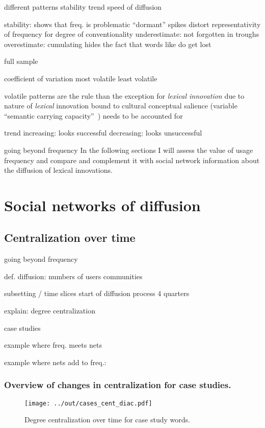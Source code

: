 \documentclass[draft, a4paper, abstract=on]{scrartcl}
\begin{document}
different patterns
stability
trend
speed of diffusion

stability: shows that freq. is problematic
\enquote{dormant}
spikes distort representativity of frequency for degree of conventionality
underestimate:  not forgotten in troughs
overestimate: cumulating hides the fact that words like  do get lost

full sample

coefficient of variation
most volatile
least volatile

volatile patterns are the rule than the exception for \emph{lexical innovation}
due to nature of \emph{lexical} innovation
bound to cultural conceptual salience (variable \enquote{semantic carrying capacity}~\parencite{Nini2017ApplicationGrowth})
needs to be accounted for

trend
increasing: looks successful
decreasing: looks unsuccessful

going beyond frequency
In the following sections I will assess the value of usage frequency and compare and complement it with social network information about the diffusion of lexical innovations.

\section{Social networks of diffusion}

  \subsection{Centralization over time}

going beyond frequency

def. diffusion:
numbers of users
communities

subsetting / time slices
start of diffusion process
4 quarters

explain: degree centralization

case studies

example where freq. meets nets

example where nets add to freq.: 

    \subsubsection{Overview of changes in centralization for case studies.}

\begin{figure}[H]
\caption{Degree centralization over time for case study words.}
\centering
\texttt{[image: ../out/cases\_cent\_diac.pdf]}
\end{figure}
\end{document}
